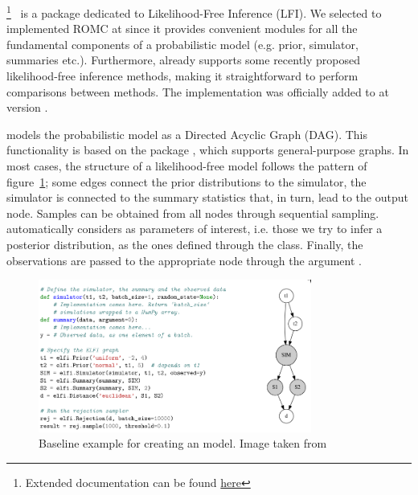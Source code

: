 \footnote{Extended
  documentation can be found
  \href{https://elfi.readthedocs.io/en/latest/}{here}}~\cite{1708.00707}
is a  package dedicated to Likelihood-Free Inference
(LFI). We selected to implemented ROMC at  since it provides
convenient modules for all the fundamental components of a
probabilistic model (e.g. prior, simulator, summaries
etc.). Furthermore,  already supports some recently proposed
likelihood-free inference methods, making it straightforward to
perform comparisons between methods. The implementation was officially
added to  at version .


 models the probabilistic model as a Directed Acyclic Graph
(DAG). This functionality is based on the package ,
which supports general-purpose graphs. In most cases, the structure of
a likelihood-free model follows the pattern of figure~\ref{fig:elfi};
some edges connect the prior distributions to the simulator, the
simulator is connected to the summary statistics that, in turn, lead
to the output node. Samples can be obtained from all nodes through
sequential sampling.  automatically considers as parameters
of interest, i.e. those we try to infer a posterior distribution,
as the ones  defined through the  class. Finally, the
observations are passed to the appropriate node through the argument
.

\begin{figure}[h]
    \begin{center}
      \includegraphics[width=0.8\textwidth]{./latex_files/images/chapter2/elfi.png}
    \end{center}
    \caption[Baseline example for creating an  model]{Baseline example for creating an  model. Image taken from \cite{1708.00707}}
    \label{fig:elfi}
\end{figure}

